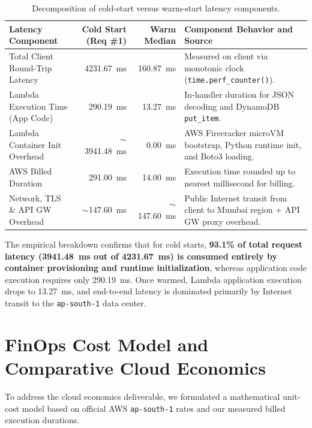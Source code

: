 \documentclass[10pt,a4paper]{article}
\begin{document}
\begin{table}[H]
\centering
\caption{Decomposition of cold-start versus warm-start latency components.}
\label{tab:latency_breakdown}
\small
\begin{tabularx}{\textwidth}{l r r X}
\toprule
\textbf{Latency Component} & \textbf{Cold Start (Req \#1)} & \textbf{Warm Median} & \textbf{Component Behavior and Source} \\
\midrule
Total Client Round-Trip Latency & 4231.67~ms & 160.87~ms & Measured on client via monotonic clock (\texttt{time.perf\_counter()}). \\
Lambda Execution Time (App Code) & 290.19~ms & 13.27~ms & In-handler duration for JSON decoding and DynamoDB \texttt{put\_item}. \\
Lambda Container Init Overhead & $\sim$3941.48~ms & 0.00~ms & AWS Firecracker microVM bootstrap, Python runtime init, and Boto3 loading. \\
AWS Billed Duration & 291.00~ms & 14.00~ms & Execution time rounded up to nearest millisecond for billing. \\
Network, TLS \& API GW Overhead & $\sim$147.60~ms & $\sim$147.60~ms & Public Internet transit from client to Mumbai region + API GW proxy overhead. \\
\bottomrule
\end{tabularx}
\end{table}

The empirical breakdown confirms that for cold starts, \textbf{93.1\% of total request latency (3941.48~ms out of 4231.67~ms) is consumed entirely by container provisioning and runtime initialization}, whereas application code execution requires only 290.19~ms. Once warmed, Lambda application execution drops to 13.27~ms, and end-to-end latency is dominated primarily by Internet transit to the \texttt{ap-south-1} data center.

\section{FinOps Cost Model and Comparative Cloud Economics}
To address the cloud economics deliverable, we formulated a mathematical unit-cost model based on official AWS \texttt{ap-south-1} rates and our measured billed execution durations.
\end{document}

